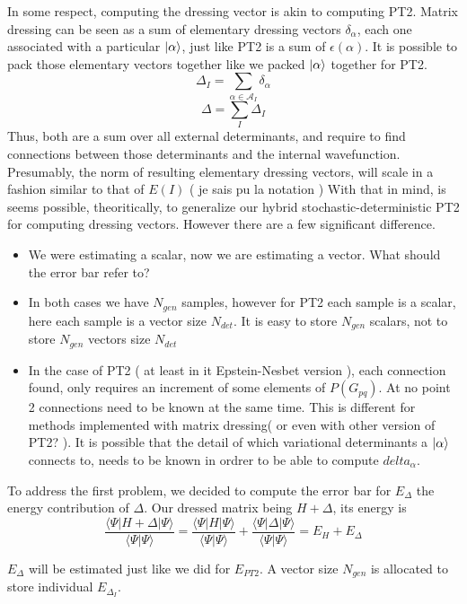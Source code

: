 In some respect, computing the dressing vector is akin to computing PT2. Matrix dressing can be seen as a sum of elementary dressing vectors $\delta_\alpha$, each one associated with a particular $| \alpha \rangle$, just like PT2 is a sum of $\epsilon(\alpha)$. It is possible to pack those elementary vectors together like we packed $| \alpha \rangle$ together for PT2.
$$\Delta_I = \sum_{\alpha \in \mathcal{A}_I} \delta_\alpha$$
$$\Delta = \sum_{I} \Delta_I$$
Thus, both are a sum over all external determinants, and require to find connections between those determinants and the internal wavefunction. Presumably, the norm of resulting elementary dressing vectors, will scale in a fashion similar to that of $E(I)$ ( je sais pu la notation )
With that in mind, is seems possible, theoritically, to generalize our hybrid stochastic-deterministic PT2 for computing dressing vectors.
However there are a few significant difference.
\begin{itemize}
\item
We were estimating a scalar, now we are estimating a vector. What should the error bar refer to?
\item
In both cases we have $N_{gen}$ samples, however for PT2 each sample is a scalar, here each sample is a vector size $N_{det}$. It is easy to store $N_{gen}$ scalars, not to store $N_{gen}$ vectors size $N_{det}$
\item
In the case of PT2 ( at least in it Epstein-Nesbet version ), each connection found, only requires an increment of some elements of $P(G_{pq})$. At no point 2 connections need to be known at the same time. This is different for methods implemented with matrix dressing( or even with other version of PT2? ). It is possible that the detail of which variational determinants a $| \alpha \rangle$ connects to, needs to be known in ordrer to be able to compute $delta_\alpha$.
\end{itemize}

To address the first problem, we decided to compute the error bar for $E_{\Delta}$ the energy contribution of $\Delta$. Our dressed matrix being $H + \Delta$, its energy is
    $$\frac{\langle \Psi |H + \Delta | \Psi\rangle}{\langle \Psi | \Psi \rangle} = \frac{\langle \Psi |H  | \Psi\rangle}{\langle \Psi | \Psi \rangle} + \frac{\langle \Psi |\Delta | \Psi\rangle}{\langle \Psi | \Psi \rangle} = E_H + E_{\Delta} $$

$E_{\Delta}$ will be estimated just like we did for $E_{PT2}$. A vector size $N_{gen}$ is allocated to store individual $E_{\Delta_I}$.

